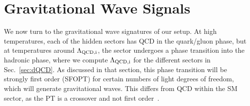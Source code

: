 \documentclass[nofootinbib,twocolumn,preprintnumbers]{revtex4-1}
\begin{document}
\section{Gravitational Wave Signals}



\label{sec:gw}

We now turn to the gravitational wave signatures of our setup. At high temperatures, each of the hidden sectors has QCD in the quark/gluon phase, but at temperatures around $\Lambda_{\rm QCD,i}$, the sector undergoes a phase transition into the hadronic phase, where we compute $\Lambda_{\rm QCD,i}$ for the different sectors in Sec.~\ref{sec:dQCD}. As discussed in that section, this phase transition will be strongly first order (SFOPT) for certain numbers of light degrees of freedom, which will generate gravitational waves. This differs from QCD within the SM sector, as the PT is a crossover and not first order~\cite{Fodor:2001pe}. 


\end{document}
